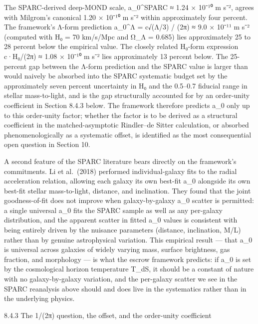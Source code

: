 \documentclass[11pt]{article}
\begin{document}
The SPARC-derived deep-MOND scale, a\_0\^{}SPARC ≈ 1.24 × 10⁻¹⁰ m s⁻², agrees with Milgrom's canonical 1.20 × 10⁻¹⁰ m s⁻² within approximately four percent. The framework's Λ-form prediction a\_0\^{}Λ = c√(Λ/3) / (2π) ≈ 9.0 × 10⁻¹¹ m s⁻² (computed with H₀ = 70 km/s/Mpc and Ω\_Λ = 0.685) lies approximately 25 to 28 percent below the empirical value. The closely related H₀-form expression c·H₀/(2π) ≈ 1.08 × 10⁻¹⁰ m s⁻² lies approximately 13 percent below. The 25-percent gap between the Λ-form prediction and the SPARC value is larger than would naively be absorbed into the SPARC systematic budget set by the approximately seven percent uncertainty in H₀ and the 0.5--0.7 fiducial range in stellar mass-to-light, and is the gap structurally accounted for by an order-unity coefficient in Section 8.4.3 below. The framework therefore predicts a\_0 only up to this order-unity factor; whether the factor is to be derived as a structural coefficient in the matched-asymptotic Rindler--de Sitter calculation, or absorbed phenomenologically as a systematic offset, is identified as the most consequential open question in Section 10.

A second feature of the SPARC literature bears directly on the framework's commitments. Li et al.~(2018) performed individual-galaxy fits to the radial acceleration relation, allowing each galaxy its own best-fit a\_0 alongside its own best-fit stellar mass-to-light, distance, and inclination. They found that the joint goodness-of-fit does not improve when galaxy-by-galaxy a\_0 scatter is permitted: a single universal a\_0 fits the SPARC sample as well as any per-galaxy distribution, and the apparent scatter in fitted a\_0 values is consistent with being entirely driven by the nuisance parameters (distance, inclination, M/L) rather than by genuine astrophysical variation. This empirical result --- that a\_0 is universal across galaxies of widely varying mass, surface brightness, gas fraction, and morphology --- is what the escrow framework predicts: if a\_0 is set by the cosmological horizon temperature T\_dS, it should be a constant of nature with no galaxy-by-galaxy variation, and the per-galaxy scatter we see in the SPARC reanalysis above should and does live in the systematics rather than in the underlying physics.

8.4.3 The 1/(2π) question, the offset, and the order-unity coefficient
\end{document}
